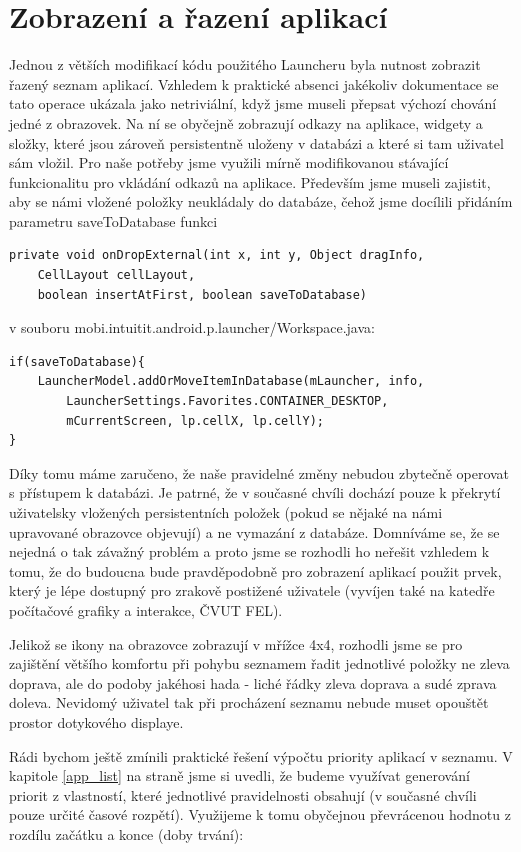 \documentclass[thesis=M,czech]{FITthesis}[2012/06/26]
\begin{document}
\section{Zobrazení a řazení aplikací}
Jednou z větších modifikací kódu použitého Launcheru byla nutnost zobrazit řazený seznam aplikací. Vzhledem k praktické absenci jakékoliv dokumentace se tato operace ukázala jako netriviální, když jsme museli přepsat výchozí chování jedné z obrazovek. Na ní se obyčejně zobrazují odkazy na aplikace, widgety a složky, které jsou zároveň persistentně uloženy v databázi a které si tam uživatel sám vložil. Pro naše potřeby jsme využili mírně modifikovanou stávající funkcionalitu pro vkládání odkazů na aplikace. Především jsme museli zajistit, aby se námi vložené položky neukládaly do databáze, čehož jsme docílili přidáním parametru saveToDatabase funkci

\begin{verbatim}
private void onDropExternal(int x, int y, Object dragInfo, 
    CellLayout cellLayout,
    boolean insertAtFirst, boolean saveToDatabase)
\end{verbatim}
v souboru mobi.intuitit.android.p.launcher/Workspace.java:

\begin{verbatim}
if(saveToDatabase){
    LauncherModel.addOrMoveItemInDatabase(mLauncher, info,
        LauncherSettings.Favorites.CONTAINER_DESKTOP, 
        mCurrentScreen, lp.cellX, lp.cellY);
}
\end{verbatim}

Díky tomu máme zaručeno, že naše pravidelné změny nebudou zbytečně operovat s přístupem k databázi. Je patrné, že v současné chvíli dochází pouze k překrytí uživatelsky vložených persistentních položek (pokud se nějaké na námi upravované obrazovce objevují) a ne vymazání z databáze. Domníváme se, že se nejedná o tak závažný problém a proto jsme se rozhodli ho neřešit vzhledem k tomu, že do budoucna bude pravděpodobně pro zobrazení aplikací použit prvek, který je lépe dostupný pro zrakově postižené uživatele (vyvíjen také na katedře počítačové grafiky a interakce, ČVUT FEL).

Jelikož se ikony na obrazovce zobrazují v mřížce 4x4, rozhodli jsme se pro zajištění většího komfortu při pohybu seznamem řadit jednotlivé položky ne zleva doprava, ale do podoby jakéhosi hada - liché řádky zleva doprava a sudé zprava doleva. Nevidomý uživatel tak při procházení seznamu nebude muset opouštět prostor dotykového displaye.

Rádi bychom ještě zmínili praktické řešení výpočtu priority aplikací v seznamu. V kapitole \ref{app_list} na straně \pageref{app_list} jsme si uvedli, že budeme využívat generování priorit z vlastností, které jednotlivé pravidelnosti obsahují (v současné chvíli pouze určité časové rozpětí). Využijeme k tomu obyčejnou převrácenou hodnotu z rozdílu začátku a konce (doby trvání):
\end{document}
